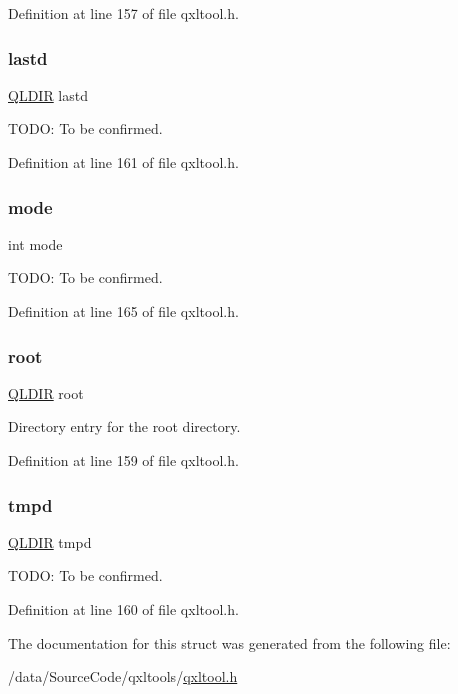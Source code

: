 Definition at line 157 of file qxltool.\+h.

\mbox{\label{struct_q_x_l_ac28f889bad43711b02d0d59d69976ded}} 
\subsubsection{\texorpdfstring{lastd}{lastd}}
{\footnotesize\ttfamily \hyperlink{struct_q_l_d_i_r}{Q\+L\+D\+IR} lastd}

T\+O\+DO\+: To be confirmed. 

Definition at line 161 of file qxltool.\+h.

\mbox{\label{struct_q_x_l_a1ea5d0cb93f22f7d0fdf804bd68c3326}} 
\subsubsection{\texorpdfstring{mode}{mode}}
{\footnotesize\ttfamily int mode}

T\+O\+DO\+: To be confirmed. 

Definition at line 165 of file qxltool.\+h.

\mbox{\label{struct_q_x_l_a375fb5f40df99977d121396f12103eac}} 
\subsubsection{\texorpdfstring{root}{root}}
{\footnotesize\ttfamily \hyperlink{struct_q_l_d_i_r}{Q\+L\+D\+IR} root}

Directory entry for the root directory. 

Definition at line 159 of file qxltool.\+h.

\mbox{\label{struct_q_x_l_aa73f3bee736003684c612c765173456b}} 
\subsubsection{\texorpdfstring{tmpd}{tmpd}}
{\footnotesize\ttfamily \hyperlink{struct_q_l_d_i_r}{Q\+L\+D\+IR} tmpd}

T\+O\+DO\+: To be confirmed. 

Definition at line 160 of file qxltool.\+h.



The documentation for this struct was generated from the following file\+:\begin{DoxyCompactItemize}
\item 
/data/\+Source\+Code/qxltools/\hyperlink{qxltool_8h}{qxltool.\+h}\end{DoxyCompactItemize}
